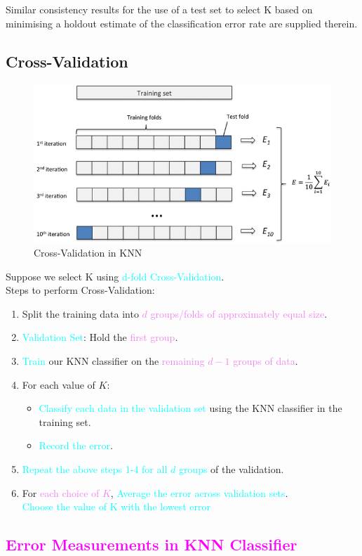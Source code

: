 \documentclass{book}
\begin{document}
\vspace{1mm}
Similar consistency results for the use of a test set to select K based on minimising a holdout estimate of the classification error rate are supplied therein.\\

\subsection{Cross-Validation}
\begin{figure}
    \centering
    \includegraphics[scale=0.3]{chapter 4/ch4_figure3.jpeg}
    \caption{Cross-Validation in KNN}
\end{figure}
Suppose we select K using \textcolor{cyan}{d-fold Cross-Validation}.\\
Steps to perform Cross-Validation:
\begin{enumerate}
    \item Split the training data into \textcolor{violet}{\(d\) groups/folds of approximately equal size}. 
    \item \textcolor{cyan}{Validation Set}: Hold the \textcolor{violet}{first group}.
    \item \textcolor{cyan}{Train} our KNN classifier on the \textcolor{violet}{remaining \(d-1\) groups of data}.
    \item For each value of \(K\):
        \begin{itemize}
            \item \textcolor{cyan}{Classify each data in the validation set} using the KNN classifier in the training set.
            \item \textcolor{cyan}{Record the error}.
        \end{itemize}
    \item \textcolor{cyan}{Repeat the above steps 1-4 for all \(d\) groups} of the validation.
    \item For \textcolor{violet}{each choice of \(K\)}, \textcolor{cyan}{Average the error across validation sets}. \\
    \textcolor{cyan}{Choose the value of K with the lowest error}
\end{enumerate}
\newpage
\textcolor{magenta}{\section{\textbf{Error Measurements in KNN Classifier}}}
\end{document}
